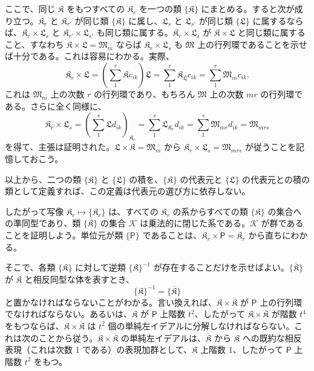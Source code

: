 ここで、同じ \(\mathfrak K\) をもつすべての \(\mathfrak K_r\) を一つの類 \(\{\mathfrak K\}\) にまとめる。すると次が成り立つ。\(\mathfrak K_r\) と \(\mathfrak K_{r'}\) が同じ類 \(\{\mathfrak K\}\) に属し、\(\mathfrak L_s\) と \(\mathfrak L_{s'}\) が同じ類 \(\{\mathfrak L\}\) に属するならば、\(\mathfrak K_r\times\mathfrak L_s\) と \(\mathfrak K_{r'}\times\mathfrak L_{s'}\) も同じ類に属する。\(\mathfrak K_r\times\mathfrak L_s\) が \(\mathfrak K\times\mathfrak L\) と同じ類に属すること、すなわち \(\mathfrak K\times\mathfrak L=\mathfrak M_m\) ならば \(\mathfrak K_r\times\mathfrak L_s\) も \(\mathfrak M\) 上の行列環であることを示せば十分である。これは容易にわかる。実際、
\[
\mathfrak K_r\times\mathfrak L
=\left(\sum_1^r\mathfrak K c_{ik}\right)\mathfrak L
=\sum_1^r\mathfrak K_{\mathfrak L}c_{ik}
=\sum_1^r\mathfrak M_m c_{ik}.
\]
これは \(\mathfrak M_m\) 上の次数 \(r\) の行列環であり、もちろん \(\mathfrak M\) 上の次数 \(mr\) の行列環である。さらに全く同様に、
\[
\mathfrak K_r\times\mathfrak L_s
=\left(\sum_1^s\mathfrak L d_{ik}\right)_{\mathfrak K_r}
=\sum_1^s\mathfrak L_{\mathfrak K_r}d_{ik}
=\sum_1^s\mathfrak M_{mr}d_{ik}
=\mathfrak M_{mrs}
\]
を得て、主張は証明された。\(\mathfrak L\times\mathfrak K=\mathfrak M_m\) から \(\mathfrak K_r\times\mathfrak L_s=\mathfrak M_{mrs}\) が従うことを記憶しておこう。

以上から、二つの類 \(\{\mathfrak K\}\) と \(\{\mathfrak L\}\) の積を、\(\{\mathfrak K\}\) の代表元と \(\{\mathfrak L\}\) の代表元との積の類として定義すれば、この定義は代表元の選び方に依存しない。

したがって写像 \(\mathfrak K_r\mapsto\{\mathfrak K_r\}\) は、すべての \(\mathfrak K_r\) の系からすべての類 \(\{\mathfrak K\}\) の集合への準同型であり、類 \(\{\mathfrak K\}\) の集合 \(\mathscr K\) は乗法的に閉じた系である。\(\mathscr K\) が群であることを証明しよう。単位元が類 \(\{\mathsf P\}\) であることは、\(\mathfrak K_r\times\mathsf P=\mathfrak K_r\) から直ちにわかる。

そこで、各類 \(\{\mathfrak K\}\) に対して逆類 \(\{\mathfrak K\}^{-1}\) が存在することだけを示せばよい。\(\{\overline{\mathfrak K}\}\) が \(\mathfrak K\) と相反同型な体を表すとき、
\[
\{\mathfrak K\}^{-1}=\{\overline{\mathfrak K}\}
\]
と置かなければならないことがわかる。言い換えれば、\(\mathfrak K\times\overline{\mathfrak K}\) が \(\mathsf P\) 上の行列環でなければならない。あるいは、\(\mathfrak K\) が \(\mathsf P\) 上階数 \(t^2\)、したがって \(\mathfrak K\times\overline{\mathfrak K}\) が階数 \(t^4\) をもつならば、\(\mathfrak K\times\overline{\mathfrak K}\) は \(t^2\) 個の単純左イデアルに分解しなければならない。これは次のことから従う。\(\mathfrak K\times\overline{\mathfrak K}\) の単純左イデアルは、\(\overline{\mathfrak K}\) から \(\mathfrak K\) への既約な相反表現（これは次数 1 である）の表現加群として、\(\mathfrak K\) 上階数 1、したがって \(\mathsf P\) 上階数 \(t^2\) をもつ。

